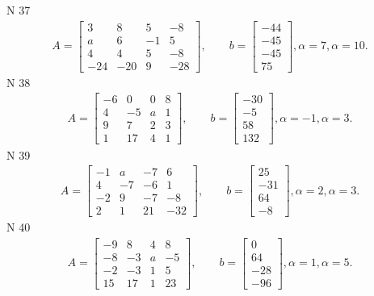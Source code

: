 \documentclass[11pt]{report}
\begin{document}
N 37
\begin{align*}
 A = \left[\begin{matrix}3 & 8 & 5 & -8\\a & 6 & -1 & 5\\4 & 4 & 5 & -8\\-24 & -20 & 9 & -28\end{matrix}\right],
    \qquad b = \left[\begin{matrix}-44\\-45\\-45\\75\end{matrix}\right], \alpha = 7, \alpha = 10. 
 \end{align*}
N 38
\begin{align*}
 A = \left[\begin{matrix}-6 & 0 & 0 & 8\\4 & -5 & a & 1\\9 & 7 & 2 & 3\\1 & 17 & 4 & 1\end{matrix}\right],
    \qquad b = \left[\begin{matrix}-30\\-5\\58\\132\end{matrix}\right], \alpha = -1, \alpha = 3. 
 \end{align*}
N 39
\begin{align*}
 A = \left[\begin{matrix}-1 & a & -7 & 6\\4 & -7 & -6 & 1\\-2 & 9 & -7 & -8\\2 & 1 & 21 & -32\end{matrix}\right],
    \qquad b = \left[\begin{matrix}25\\-31\\64\\-8\end{matrix}\right], \alpha = 2, \alpha = 3. 
 \end{align*}
N 40
\begin{align*}
 A = \left[\begin{matrix}-9 & 8 & 4 & 8\\-8 & -3 & a & -5\\-2 & -3 & 1 & 5\\15 & 17 & 1 & 23\end{matrix}\right],
    \qquad b = \left[\begin{matrix}0\\64\\-28\\-96\end{matrix}\right], \alpha = 1, \alpha = 5. 
 \end{align*}
\end{document}
